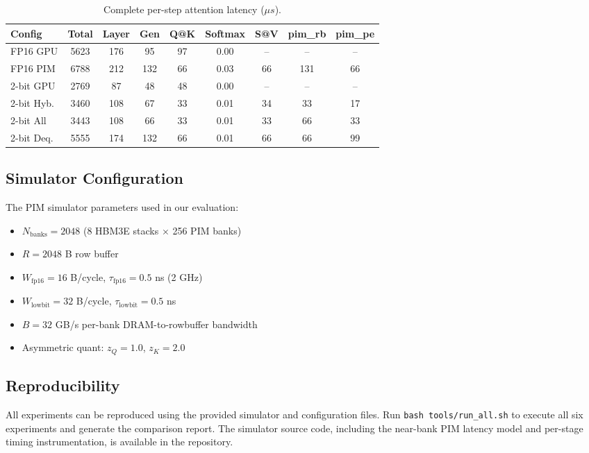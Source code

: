\begin{table}[h]
\caption{Complete per-step attention latency ($\mu s$).}
\label{tab:full}
\centering
\small
\begin{tabular}{lcccccccc}
\toprule
\textbf{Config} & \textbf{Total} & \textbf{Layer} & \textbf{Gen} & \textbf{Q@K} & \textbf{Softmax} & \textbf{S@V} & \textbf{pim\_rb} & \textbf{pim\_pe} \\
\midrule
FP16 GPU   & 5623 & 176 & 95  & 97 & 0.00 & -- & -- & -- \\
FP16 PIM   & 6788 & 212 & 132 & 66 & 0.03 & 66 & 131 & 66 \\
2-bit GPU  & 2769 & 87  & 48  & 48 & 0.00 & -- & -- & -- \\
2-bit Hyb. & 3460 & 108 & 67  & 33 & 0.01 & 34 & 33  & 17 \\
2-bit All  & 3443 & 108 & 66  & 33 & 0.01 & 33 & 66  & 33 \\
2-bit Deq. & 5555 & 174 & 132 & 66 & 0.01 & 66 & 66  & 99 \\
\bottomrule
\end{tabular}
\end{table}

\subsection{Simulator Configuration}

The PIM simulator parameters used in our evaluation:
\begin{itemize}[nosep]
\item $N_{\text{banks}} = 2048$ (8 HBM3E stacks $\times$ 256 PIM banks)
\item $R = 2048$ B row buffer
\item $W_{\text{fp16}} = 16$ B/cycle, $\tau_{\text{fp16}} = 0.5$ ns (2 GHz)
\item $W_{\text{lowbit}} = 32$ B/cycle, $\tau_{\text{lowbit}} = 0.5$ ns
\item $B = 32$ GB/s per-bank DRAM-to-rowbuffer bandwidth
\item Asymmetric quant: $z_Q = 1.0$, $z_K = 2.0$
\end{itemize}

\subsection{Reproducibility}

All experiments can be reproduced using the provided simulator and configuration files.
Run \texttt{bash tools/run\_all.sh} to execute all six experiments and generate the comparison report.
The simulator source code, including the near-bank PIM latency model and per-stage timing instrumentation, is available in the repository.

